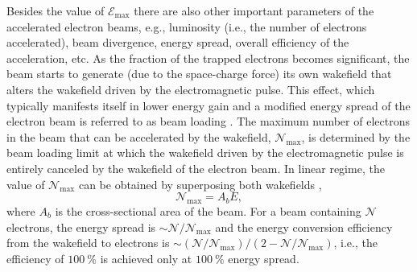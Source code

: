 \documentclass[10pt, a4paper, twoside, openright]{report}
\begin{document}
Besides the value of $ \mathcal{E}_{\mathrm{max}} $ there are also other important parameters of the accelerated electron beams, e.g., luminosity (i.e., the number of electrons accelerated), beam divergence, energy spread, overall efficiency of the acceleration, etc. As the fraction of the trapped electrons becomes significant, the beam starts to generate (due to the space-charge force) its own wakefield that alters the wakefield driven by the electromagnetic pulse. This effect, which typically manifests itself in lower energy gain and a modified energy spread of the electron beam is referred to as beam loading \cite{Katsouleas1987, Tzoufras2008, Tzoufras2009}. The maximum number of electrons in the beam that can be accelerated by the wakefield, $ \mathcal{N}_{\mathrm{max}} $, is determined by the beam loading limit at which the wakefield driven by the electromagnetic pulse is entirely canceled by the wakefield of the electron beam. In linear regime, the value of $ \mathcal{N}_{\mathrm{max}} $ can be obtained by superposing both wakefields \cite{Katsouleas1987},
\begin{equation}\label{eq:beam_loading}
	 \mathcal{N}_{\mathrm{max}} = A_{b} E,
\end{equation}
where $ A_b $ is the cross-sectional area of the beam. For a beam containing $ \mathcal{N} $ electrons, the energy spread is $ \sim \mathcal{N} / \mathcal{N}_{\mathrm{max}} $ and the energy conversion efficiency from the wakefield to electrons is $ \sim \left( \mathcal{N} / \mathcal{N}_{\mathrm{max}} \right) / \left( 2 - \mathcal{N} / \mathcal{N}_{\mathrm{max}} \right) $, i.e., the efficiency of $ 100 \ \% $ is achieved only at $ 100 \ \% $ energy spread.


%

%

%

%
\end{document}
